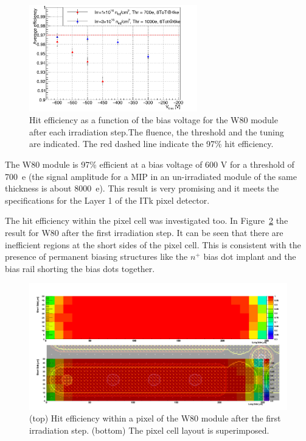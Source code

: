 \begin{figure}[!htpb]
\centering
\includegraphics[width=0.65\textwidth]{newHit_Eff_W80.pdf}
\caption{\label{fig:Hit_Eff_W80}Hit efficiency as a function of the bias voltage for the W80 module after each irradiation step.The fluence, the threshold and the tuning 
are indicated. The red dashed line indicate the 97\% 
hit efficiency.}
\end{figure}

The W80 module is 97\% efficient at a bias voltage of 600 V for a threshold of 700~e (the signal amplitude 
for a MIP in an un-irradiated module of the same thickness is about 8000~e). This result is very 
promising and it meets  the specifications for the Layer 1 of the ITk pixel detector.


The hit efficiency within the pixel cell was investigated too. In Figure~\ref{fig:NPTW80InpixelEff.pdf} 
the result for W80 after the first irradiation step. It can be seen that there are inefficient regions 
at the short sides of the pixel cell. This is consistent with the presence of permanent biasing structures 
like the $n^+$ bias dot implant and the bias rail shorting the bias dots together.

\begin{figure}[!htpb]
\centering
\includegraphics[width=1.00\textwidth]{NPTW80InpixelEff.pdf}
\caption{\label{fig:NPTW80InpixelEff.pdf} (top) Hit efficiency within a pixel of the W80 module after the first irradiation step. (bottom) The pixel cell layout is superimposed.}
\end{figure}


